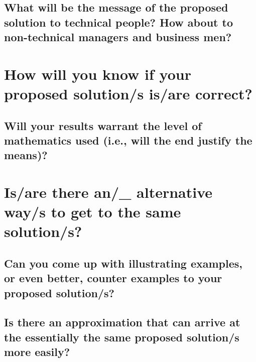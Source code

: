 \graytx{\blindtext}
				
						
\subsection*{\thesubsection\quad What will be the message of the proposed solution to technical people?  How about to non-technical managers and business men?}
			
\graytx{\blindtext}





\section*{\thesection\quad How will you know if your proposed solution/s is/are correct?}

\graytx{\blindtext} 
			
			
\subsection*{\thesubsection\quad Will your results warrant the level of mathematics used (i.e., will the end justify the means)?}
	    
\graytx{\blindtext}
			





\section*{\thesection\quad Is/are there an/\_ alternative way/s to get to the same solution/s?}

\graytx{\blindtext}
	
	
\subsection*{\thesubsection\quad Can you come up with illustrating examples, or even better, counter examples to your proposed solution/s?}

\graytx{\blindtext}
	
	
\subsection*{\thesubsection\quad Is there an approximation that can arrive at the essentially the same proposed solution/s more easily?}
	
